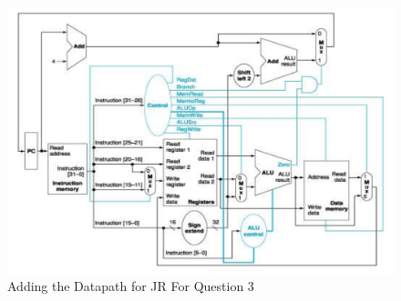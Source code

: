 \documentclass[paper=usletter, fontsize=12pt]{article}
\begin{document}
\begin{enumerate}
            \begin{figure}[ht]
                \begin{center}
                    \includegraphics[width=1\textwidth]{circuit.png}
                    \caption{Adding the Datapath for JR For Question 3} \label{fig:circuit}
                \end{center}
            \end{figure}
            \newpage

    \end{enumerate}
\end{document}

